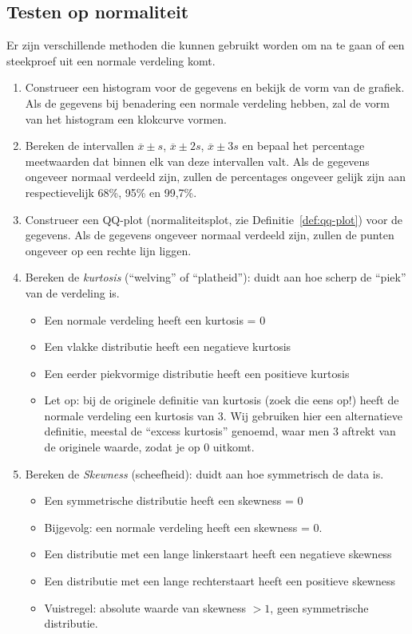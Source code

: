 \subsection{Testen op normaliteit}
\label{sec:normtesting}

Er zijn verschillende methoden die kunnen gebruikt worden om na te gaan of een steekproef uit een normale verdeling komt.
\begin{enumerate}
  \item Construeer een histogram voor de gegevens en bekijk de vorm van de grafiek. Als de gegevens bij benadering een normale verdeling hebben, zal de vorm van het histogram een klokcurve vormen.
  \item Bereken de intervallen $\overline{x} \pm s$, $\overline{x} \pm 2s$, $\overline{x} \pm 3s$ en bepaal het percentage meetwaarden dat binnen elk van deze intervallen valt. Als de gegevens ongeveer normaal verdeeld zijn, zullen de percentages ongeveer gelijk zijn aan respectievelijk 68\%, 95\% en 99,7\%.
  \item Construeer een QQ-plot (normaliteitsplot, zie Definitie~\ref{def:qq-plot}) voor de gegevens. Als de gegevens ongeveer normaal verdeeld zijn, zullen de punten ongeveer op een rechte lijn liggen.
  \item Bereken de \emph{kurtosis} (``welving'' of ``platheid''): duidt aan hoe scherp de ``piek'' van de verdeling is.
    \begin{itemize}
      \item Een normale verdeling heeft een kurtosis = 0
      \item Een vlakke distributie heeft een negatieve kurtosis
      \item Een eerder piekvormige distributie heeft een positieve kurtosis
      \item Let op: bij de originele definitie van kurtosis (zoek die eens op!) heeft de normale verdeling een kurtosis van 3. Wij gebruiken hier een alternatieve definitie, meestal de ``excess kurtosis'' genoemd, waar men 3 aftrekt van de originele waarde, zodat je op 0 uitkomt.
    \end{itemize}
  \item Bereken de \emph{Skewness} (scheefheid): duidt aan hoe symmetrisch de data is.
    \begin{itemize}
      \item Een symmetrische distributie heeft een skewness = 0
      \item Bijgevolg: een normale verdeling heeft een skewness = 0.
      \item Een distributie met een lange linkerstaart heeft een negatieve skewness
      \item Een distributie met een lange rechterstaart heeft een positieve skewness
      \item Vuistregel: absolute waarde van skewness $>1$, geen symmetrische distributie.
    \end{itemize}
\end{enumerate}

